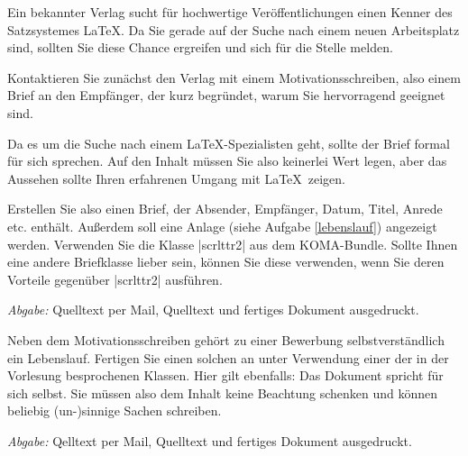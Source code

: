 \documentclass{scrartcl}
\newcommand{\abgabe}[1]{\par\noindent\textit{Abgabe:} #1}
\begin{document}
\begin{abstract}
\noindent Dies ist das letzte Übungsblatt und damit die letzte Chance Punkte für den Scheinerwerb zu erhalten. Eine kurze Übersicht zu den Notengrenzen finden Sie auf der \href{http://latexkurs.de/}{Vorlesungshomepage}. Sie haben den Kurs demnach bestanden wenn Sie insgesamt 66 oder mehr Punkte erreicht haben.

Falls Sie einzelne Übungszettel bisher noch nicht abgegeben haben und falls die Punkte dieser Zetteln relevant für Sie sein sollten (z.\,B. um die Bestehensgrenze zu erreichen), reichen Sie diese bitte bist \emph{spätestens Freitag den 29.01.} in der Vorlesung nach und geben Sie eine gute Begründungen, warum Ihnen eine fristgerechte Abgabe nicht möglich war.
\end{abstract}

\noindent Ein bekannter Verlag sucht für hochwertige Veröffentlichungen einen Kenner des Satzsystemes \LaTeX. Da Sie gerade auf der Suche nach einem neuen Arbeitsplatz sind, sollten Sie diese Chance ergreifen und sich für die Stelle melden.\vspace{1.6ex}


\begin{question}[subtitle=Anschreiben]{6}
	Kontaktieren Sie zunächst den Verlag mit einem Motivationsschreiben, also einem Brief an den Empfänger, der kurz begründet, warum Sie hervorragend geeignet sind.

Da es um die Suche nach einem \LaTeX-Spezialisten geht, sollte der Brief formal für sich sprechen. Auf den Inhalt müssen Sie also keinerlei Wert legen, aber das Aussehen sollte Ihren erfahrenen Umgang mit \LaTeX\ zeigen.

Erstellen Sie also einen Brief, der Absender, Empfänger, Datum, Titel, Anrede etc. enthält. Außerdem soll eine Anlage (siehe Aufgabe \ref{lebenslauf}) angezeigt werden. Verwenden Sie die Klasse |scrlttr2| aus dem KOMA-Bundle. Sollte Ihnen eine andere Briefklasse lieber sein, können Sie diese verwenden, wenn Sie deren Vorteile gegenüber |scrlttr2| ausführen.
\abgabe{Quelltext per Mail, Quelltext und fertiges Dokument ausgedruckt.}
\end{question}

\begin{question}[subtitle=Lebenslauf]{6}\label{lebenslauf}
	Neben dem Motivationsschreiben gehört zu einer Bewerbung selbstverständlich ein Lebenslauf. Fertigen Sie einen solchen an unter Verwendung einer der in der Vorlesung besprochenen Klassen. Hier gilt ebenfalls: Das Dokument spricht für sich selbst. Sie müssen also dem Inhalt keine Beachtung schenken und können beliebig (un-)sinnige Sachen schreiben.
\abgabe{Qelltext per Mail, Quelltext und fertiges Dokument ausgedruckt.}
\end{question}
\end{document}
